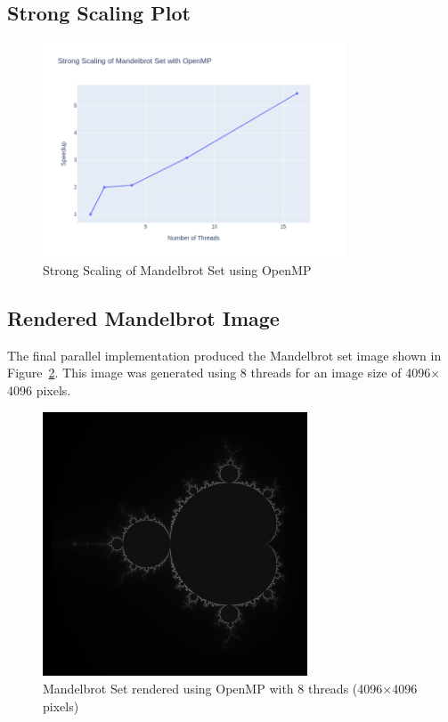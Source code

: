 \documentclass[unicode,11pt,a4paper,oneside,numbers=endperiod,openany]{scrartcl}
\begin{document}
\subsection{Strong Scaling Plot}
\begin{figure}[h!]
\centering
\includegraphics[width=0.8\textwidth]{./figures/Figure 6: strong_scaling_plot.png}
\caption{Strong Scaling of Mandelbrot Set using OpenMP}
\label{fig:strong_scaling}
\end{figure}

\subsection{Rendered Mandelbrot Image}
The final parallel implementation produced the Mandelbrot set image shown in Figure~\ref{fig:mandel_image}. This image was generated using 8 threads for an image size of 4096$\times$4096 pixels.

\begin{figure}[h!]
\centering
\includegraphics[width=0.7\textwidth]{./figures/Figure 7: mandel_4096x4096_1threads.png}
\caption{Mandelbrot Set rendered using OpenMP with 8 threads (4096$\times$4096 pixels)}
\label{fig:mandel_image}
\end{figure}
\end{document}
